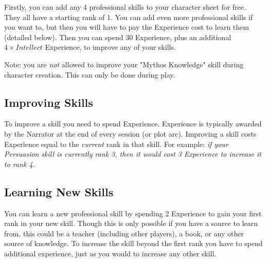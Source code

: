 Firstly, you can add any 4 professional skills to your character sheet for free. 
They all have a starting rank of 1.
You can add even more professional skills if you want to, 
but then you will have to pay the Experience cost to learn them (detailed below).
Then you can spend 30 Experience, plus an additional $4 \times Intellect$ Experience, to improve any of your skills.

Note: you are \textit{not} allowed to improve your "Mythos Knowledge" skill during character creation.
This can only be done during play. 

\subsection{Improving Skills}
To improve a skill you need to spend Experience.
Experience is typically awarded by the Narrator at the end of every session (or plot arc).
Improving a skill costs Experience equal to the \textit{current} rank in that skill.
For example: \textit{if your Persuasion skill is currently rank 3, then it would cost 3 Experience to increase it to rank 4.}

\subsection{Learning New Skills} \label{leaning-skills}
You can learn a new professional skill by spending 2 Experience to gain your first rank in your new skill.
Though this is only possible if you have a source to learn from, this could be 
a teacher (including other players), a book, or any other source of knowledge.
To increase the skill beyond the first rank you have to spend additional experience,
just as you would to increase any other skill.





